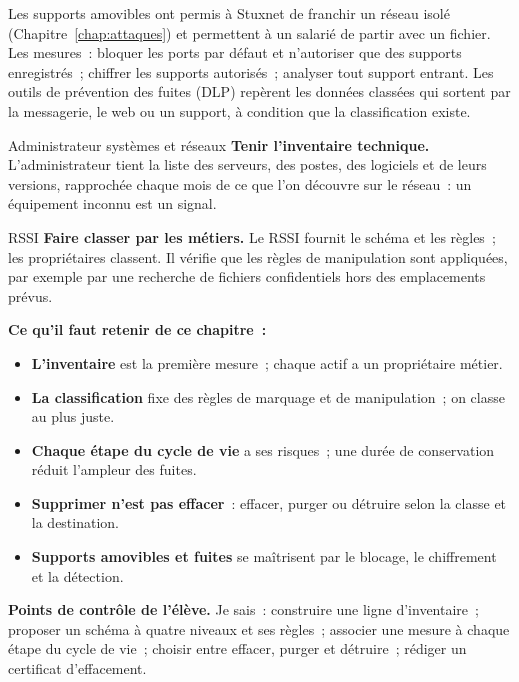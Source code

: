 Les supports amovibles ont permis à Stuxnet de franchir un réseau isolé
(Chapitre~\ref{chap:attaques}) et permettent à un salarié de partir avec
un fichier. Les mesures~: bloquer les ports par défaut et n'autoriser que
des supports enregistrés~; chiffrer les supports autorisés~; analyser tout
support entrant. Les outils de prévention des fuites (DLP) repèrent les
données classées qui sortent par la messagerie, le web ou un support,
à condition que la classification existe.

\begin{boxmetier}{Administrateur systèmes et réseaux}
\textbf{Tenir l'inventaire technique.} L'administrateur tient la liste des
serveurs, des postes, des logiciels et de leurs versions, rapprochée
chaque mois de ce que l'on découvre sur le réseau~: un équipement inconnu
est un signal.
\end{boxmetier}

\begin{boxmetier}{RSSI}
\textbf{Faire classer par les métiers.} Le RSSI fournit le schéma et les
règles~; les propriétaires classent. Il vérifie que les règles de
manipulation sont appliquées, par exemple par une recherche de fichiers
confidentiels hors des emplacements prévus.
\end{boxmetier}

\separateur

\begin{boxresume}
\textbf{Ce qu'il faut retenir de ce chapitre~:}
\begin{itemize}
    \item \textbf{L'inventaire} est la première mesure~; chaque actif a un
          propriétaire métier.
    \item \textbf{La classification} fixe des règles de marquage et de
          manipulation~; on classe au plus juste.
    \item \textbf{Chaque étape du cycle de vie} a ses risques~; une durée de
          conservation réduit l'ampleur des fuites.
    \item \textbf{Supprimer n'est pas effacer}~: effacer, purger ou
          détruire selon la classe et la destination.
    \item \textbf{Supports amovibles et fuites} se maîtrisent par le
          blocage, le chiffrement et la détection.
\end{itemize}
\end{boxresume}

\begin{boxinfo}
\textbf{Points de contrôle de l'élève.} Je sais~: construire une ligne
d'inventaire~; proposer un schéma à quatre niveaux et ses règles~;
associer une mesure à chaque étape du cycle de vie~; choisir entre
effacer, purger et détruire~; rédiger un certificat d'effacement.
\end{boxinfo}


